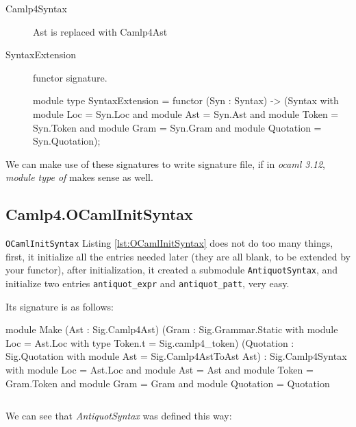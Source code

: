\begin{description}
\item[Camlp4Syntax] Ast is replaced with Camlp4Ast

\item[SyntaxExtension] functor signature.

  \begin{ocamlcode}
module type SyntaxExtension = functor (Syn : Syntax)
                    -> (Syntax with module Loc            = Syn.Loc
                                and module Ast            = Syn.Ast
                                and module Token          = Syn.Token
                                and module Gram           = Syn.Gram
                                and module Quotation      = Syn.Quotation);
    
  \end{ocamlcode}
\end{description}


We can make use of these signatures to write signature file, if in
\textit{ocaml 3.12}, \textit{module type of} makes sense as well.




\subsection{Camlp4.OCamlInitSyntax}

\verb|OCamlInitSyntax| Listing \ref{lst:OCamlInitSyntax} does not do
too many things, first, it initialize all the entries needed later
(they are all blank, to be extended by your functor), after
initialization, it created a submodule \verb|AntiquotSyntax|, and
initialize two entries \verb|antiquot_expr| and \verb|antiquot_patt|,
very easy.

Its signature is as follows:

\begin{ocamlcode}
module Make (Ast     : Sig.Camlp4Ast)
            (Gram    : Sig.Grammar.Static with module Loc = Ast.Loc
                        with type Token.t = Sig.camlp4_token)
           (Quotation : Sig.Quotation with
                        module Ast = Sig.Camlp4AstToAst Ast)
: Sig.Camlp4Syntax with module Loc = Ast.Loc
                    and module Ast = Ast
                    and module Token = Gram.Token
                    and module Gram = Gram
                    and module Quotation = Quotation  
\end{ocamlcode}
                  
\inputminted[fontsize=\scriptsize,
firstline=55]{ocaml}{code/camlp4/source/precast.ml}
We can see that \textit{AntiquotSyntax} was defined this way:

